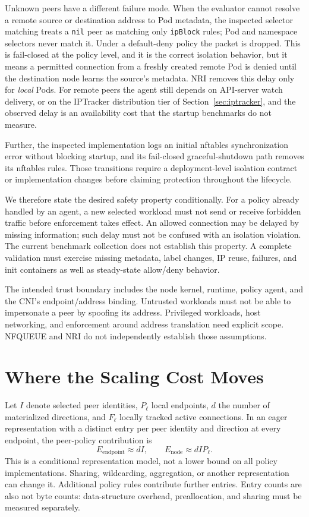 \documentclass[letterpaper,twocolumn,10pt]{article}
\begin{document}
Unknown peers have a different failure mode. When the evaluator cannot
resolve a remote source or destination address to Pod metadata, the
inspected selector matching treats a \texttt{nil} peer as matching only
\texttt{ipBlock} rules; Pod and namespace selectors never match it. Under
a default-deny policy the packet is dropped. This is fail-closed at the
policy level, and it is the correct isolation behavior, but it means a
permitted connection from a freshly created remote Pod is denied until
the destination node learns the source's metadata. NRI removes this
delay only for \emph{local} Pods. For remote peers the agent still
depends on API-server watch delivery, or on the IPTracker distribution
tier of Section~\ref{sec:iptracker}, and the observed delay is an
availability cost that the startup benchmarks do not measure.

Further, the inspected implementation logs an initial nftables
synchronization error without blocking startup, and its fail-closed
graceful-shutdown path removes its nftables rules. Those transitions
require a deployment-level isolation contract or implementation changes
before claiming protection throughout the lifecycle.

We therefore state the desired safety property conditionally. For a
policy already handled by an agent, a new selected workload must not
send or receive forbidden traffic before enforcement takes effect.
An allowed connection may be delayed by missing information; such delay
must not be confused with an isolation violation. The current benchmark
collection does not establish this property. A complete validation must
exercise missing metadata, label changes, IP reuse, failures, and init
containers as well as steady-state allow/deny behavior.

The intended trust boundary includes the node kernel, runtime, policy
agent, and the CNI's endpoint/address binding. Untrusted workloads must
not be able to impersonate a peer by spoofing its address. Privileged
workloads, host networking, and enforcement around address translation
need explicit scope. NFQUEUE and NRI do not independently establish
those assumptions.

\section{Where the Scaling Cost Moves}
\label{sec:model}
Let $I$ denote selected peer identities, $P_{\ell}$ local endpoints,
$d$ the number of materialized directions, and $F_{\ell}$ locally tracked
active connections. In an eager representation with a distinct entry
per peer identity and direction at every endpoint, the peer-policy
contribution is
\begin{equation}
E_{\mathrm{endpoint}} \approx dI,\qquad
E_{\mathrm{node}} \approx dIP_{\ell}.
\label{eq:materialization}
\end{equation}
This is a conditional representation model, not a lower bound on all
policy implementations. Sharing, wildcarding, aggregation, or another
representation can change it. Additional policy rules contribute further
entries. Entry counts are also not byte counts: data-structure overhead,
preallocation, and sharing must be measured separately.
\end{document}
